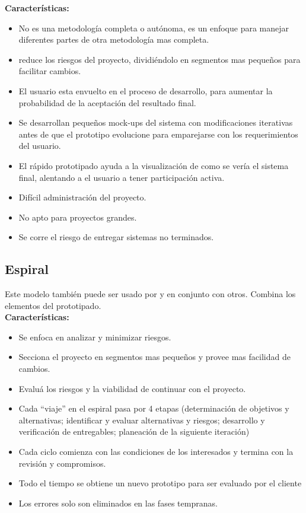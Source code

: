 \documentclass[spanish,12pt,letterpapper]{article}
\begin{document}
	\textbf{Características:}
	\begin{itemize}
	\item No es una metodología completa o autónoma, es un enfoque para manejar diferentes partes de otra metodología mas completa.
	\item reduce los riesgos del proyecto, dividiéndolo en segmentos mas pequeños para facilitar cambios.
	\item El usuario esta envuelto en el proceso de desarrollo, para aumentar la probabilidad de la aceptación del resultado final.
	\item Se desarrollan pequeños mock-ups del sistema con modificaciones iterativas antes de que el prototipo evolucione para emparejarse con los requerimientos del usuario.
	\item El rápido prototipado ayuda a la visualización de como se vería el sistema final, alentando a el usuario a tener participación activa.
	\item Difícil administración del proyecto. 
	\item No apto para proyectos grandes.
	\item Se corre el riesgo de entregar sistemas no terminados.
	\end{itemize}
	
	\subsection{Espiral}
	Este modelo también puede ser usado por y en conjunto con otros. Combina los elementos del prototipado.\\
	
	\textbf{Características:}
	\begin{itemize}
	\item Se enfoca en analizar y minimizar riesgos.
	\item Secciona el proyecto en segmentos mas pequeños y provee mas facilidad de cambios.
	\item Evaluá los riesgos y la viabilidad de continuar con el proyecto.
	\item Cada ``viaje'' en el espiral pasa por 4 etapas (determinación de objetivos y alternativas; identificar y evaluar alternativas y riesgos; desarrollo y verificación de entregables; planeación de la siguiente iteración)
	\item Cada ciclo comienza con las condiciones de los interesados y termina con la revisión y compromisos.
	\item Todo el tiempo se obtiene un nuevo prototipo para ser evaluado por el cliente
	\item Los errores solo son eliminados en las fases tempranas.
	\end{itemize}
	
\end{document}
